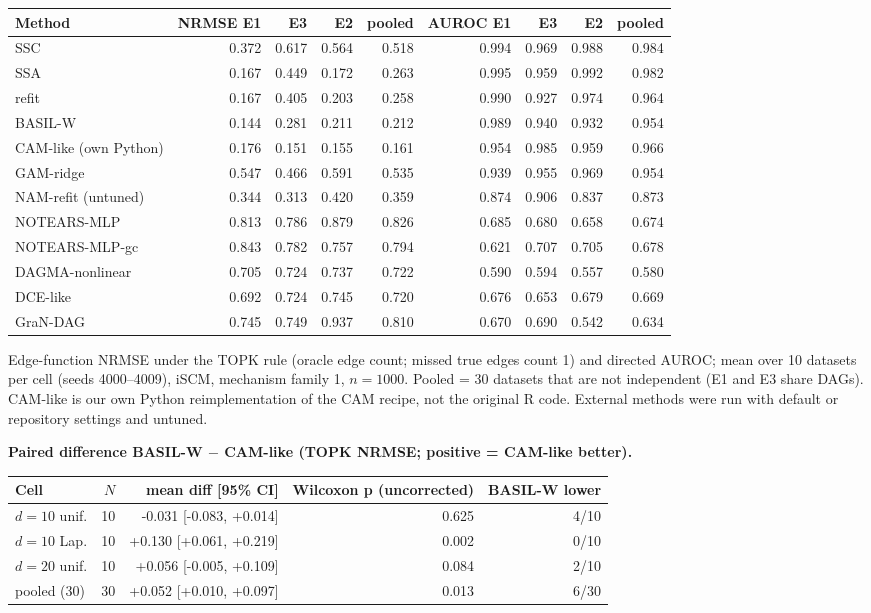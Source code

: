 \begin{adjustbox}{max width=\textwidth}
\begin{tabular}{lrrrrrrrr}
\toprule
Method & NRMSE E1 & E3 & E2 & pooled & AUROC E1 & E3 & E2 & pooled \\
\midrule
SSC & 0.372 & 0.617 & 0.564 & 0.518 & 0.994 & 0.969 & 0.988 & 0.984 \\
SSA & 0.167 & 0.449 & 0.172 & 0.263 & 0.995 & 0.959 & 0.992 & 0.982 \\
refit & 0.167 & 0.405 & 0.203 & 0.258 & 0.990 & 0.927 & 0.974 & 0.964 \\
BASIL-W & 0.144 & 0.281 & 0.211 & 0.212 & 0.989 & 0.940 & 0.932 & 0.954 \\
CAM-like (own Python) & 0.176 & 0.151 & 0.155 & 0.161 & 0.954 & 0.985 & 0.959 & 0.966 \\
GAM-ridge & 0.547 & 0.466 & 0.591 & 0.535 & 0.939 & 0.955 & 0.969 & 0.954 \\
NAM-refit (untuned) & 0.344 & 0.313 & 0.420 & 0.359 & 0.874 & 0.906 & 0.837 & 0.873 \\
NOTEARS-MLP & 0.813 & 0.786 & 0.879 & 0.826 & 0.685 & 0.680 & 0.658 & 0.674 \\
NOTEARS-MLP-gc & 0.843 & 0.782 & 0.757 & 0.794 & 0.621 & 0.707 & 0.705 & 0.678 \\
DAGMA-nonlinear & 0.705 & 0.724 & 0.737 & 0.722 & 0.590 & 0.594 & 0.557 & 0.580 \\
DCE-like & 0.692 & 0.724 & 0.745 & 0.720 & 0.676 & 0.653 & 0.679 & 0.669 \\
GraN-DAG & 0.745 & 0.749 & 0.937 & 0.810 & 0.670 & 0.690 & 0.542 & 0.634 \\
\bottomrule
\end{tabular}
\end{adjustbox}

\smallskip
{\footnotesize Edge-function NRMSE under the TOPK rule (oracle edge count; missed true edges count 1) and directed AUROC; mean over 10 datasets per cell (seeds 4000--4009), iSCM, mechanism family 1, $n=1000$. Pooled = 30 datasets that are not independent (E1 and E3 share DAGs). CAM-like is our own Python reimplementation of the CAM recipe, not the original R code. External methods were run with default or repository settings and untuned.}
\bigskip

\textbf{Paired difference BASIL-W $-$ CAM-like (TOPK NRMSE; positive = CAM-like better).}

\begin{adjustbox}{max width=\textwidth}
\begin{tabular}{lrrrr}
\toprule
Cell & $N$ & mean diff [95\% CI] & Wilcoxon p (uncorrected) & BASIL-W lower \\
\midrule
$d=10$ unif. & 10 & -0.031 [-0.083, +0.014] & 0.625 & 4/10 \\
$d=10$ Lap. & 10 & +0.130 [+0.061, +0.219] & 0.002 & 0/10 \\
$d=20$ unif. & 10 & +0.056 [-0.005, +0.109] & 0.084 & 2/10 \\
pooled (30) & 30 & +0.052 [+0.010, +0.097] & 0.013 & 6/30 \\
\bottomrule
\end{tabular}
\end{adjustbox}
